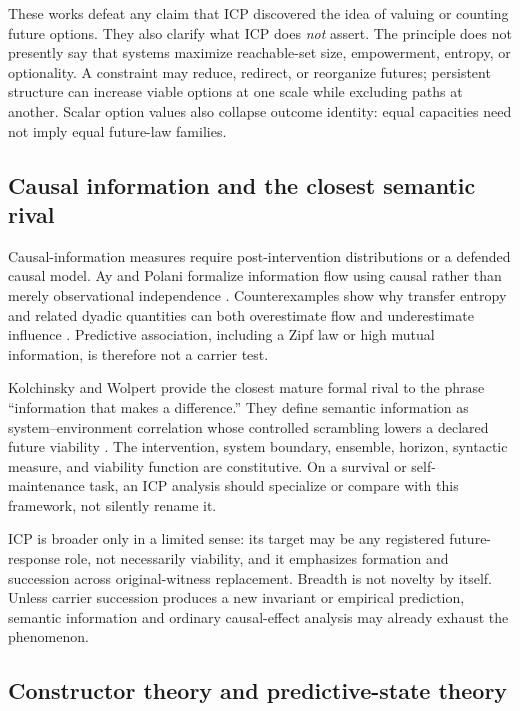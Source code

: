 These works defeat any claim that ICP discovered the idea of valuing or
counting future options. They also clarify what ICP does \emph{not} assert. The
principle does not presently say that systems maximize reachable-set size,
empowerment, entropy, or optionality. A constraint may reduce, redirect, or
reorganize futures; persistent structure can increase viable options at one
scale while excluding paths at another. Scalar option values also collapse
outcome identity: equal capacities need not imply equal future-law families.

\subsection{Causal information and the closest semantic rival}

Causal-information measures require post-intervention distributions or a
defended causal model. Ay and Polani formalize information flow using causal
rather than merely observational independence \citep{AyPolani2008InformationFlows}.
Counterexamples show why transfer entropy and related dyadic quantities can
both overestimate flow and underestimate influence
\citep{JamesEtAl2016InformationFlows}. Predictive association, including a
Zipf law or high mutual information, is therefore not a carrier test.

Kolchinsky and Wolpert provide the closest mature formal rival to the phrase
``information that makes a difference.'' They define semantic information as
system--environment correlation whose controlled scrambling lowers a declared
future viability \citep{KolchinskyWolpert2018Semantic}. The intervention,
system boundary, ensemble, horizon, syntactic measure, and viability function
are constitutive. On a survival or self-maintenance task, an ICP analysis should
specialize or compare with this framework, not silently rename it.

ICP is broader only in a limited sense: its target may be any registered
future-response role, not necessarily viability, and it emphasizes formation
and succession across original-witness replacement. Breadth is not novelty by
itself. Unless carrier succession produces a new invariant or empirical
prediction, semantic information and ordinary causal-effect analysis may
already exhaust the phenomenon.

\subsection{Constructor theory and predictive-state theory}

